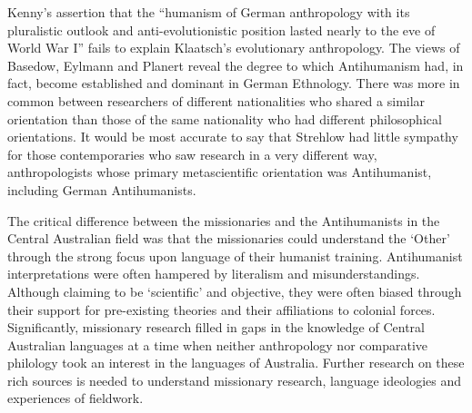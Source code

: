 \documentclass[output=paper]{langsci/langscibook}
\begin{document}
Kenny’s assertion that the ``humanism of German anthropology with its pluralistic outlook and anti-evolutionistic position lasted nearly to the eve of World War I'' fails to explain Klaatsch’s evolutionary anthropology. The views of Basedow, Eylmann and Planert reveal the degree to which Antihumanism had, in fact, become established and dominant in German Ethnology. There was more in common between researchers of different nationalities who shared a similar orientation than those of the same nationality who had different philosophical orientations.  It would be most accurate to say that Strehlow had little sympathy for those contemporaries who saw research in a very different way, anthropologists whose primary metascientific orientation was Antihumanist, including German Antihumanists. 

The critical difference between the missionaries and the Antihumanists in the Central Australian field was that the missionaries could understand the ‘Other’ through the strong focus upon language of their humanist training. Antihumanist interpretations were often hampered by literalism and misunderstandings. Although claiming to be ‘scientific’ and objective, they were often biased through their support for pre-existing theories and their affiliations to colonial forces. Significantly, missionary research filled in gaps in the knowledge of Central Australian languages at a time when neither anthropology nor comparative philology took an interest in the languages of Australia. Further research on these rich sources is needed to understand missionary research, language ideologies and experiences of fieldwork. 




{\sloppy\printbibliography[heading=subbibliography,notkeyword=this]}
\end{document}
